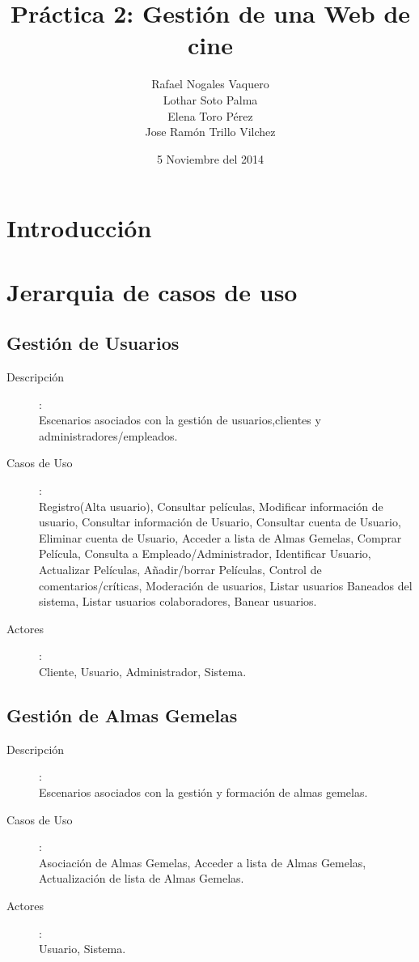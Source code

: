 \documentclass{article}
\title{Práctica 2: Gestión de una Web de cine}
\author{Rafael Nogales Vaquero
\\Lothar Soto Palma
\\Elena Toro Pérez
\\Jose Ramón Trillo Vilchez}
\date{5 Noviembre del 2014}
\begin{document}
\maketitle

\section{Introducción}
\section{Jerarquia de casos de uso}
\subsection*{Gestión de Usuarios}
	\begin{description}
	\item[Descripción]:\\ Escenarios asociados con la gestión de usuarios,clientes y administradores/empleados.
	\item[Casos de Uso]:\\ Registro(Alta usuario), Consultar películas, Modificar información de usuario, Consultar información de Usuario, Consultar cuenta de Usuario, Eliminar cuenta de Usuario, Acceder a lista de Almas Gemelas, Comprar Película, Consulta a Empleado/Administrador, Identificar Usuario, Actualizar Películas, Añadir/borrar Películas, Control de comentarios/críticas, Moderación de usuarios, Listar usuarios Baneados del sistema, Listar usuarios colaboradores, Banear usuarios.
	\item[Actores]:\\ Cliente, Usuario, Administrador, Sistema.
	\end{description}
\subsection*{Gestión de Almas Gemelas}
	\begin{description}
	\item[Descripción]:\\ Escenarios asociados con la gestión y formación de almas gemelas.
	\item[Casos de Uso]:\\ Asociación de Almas Gemelas, Acceder a lista de Almas Gemelas, Actualización de lista de Almas Gemelas.
	\item[Actores]:\\ Usuario, Sistema.
	\end{description}
\end{document}
